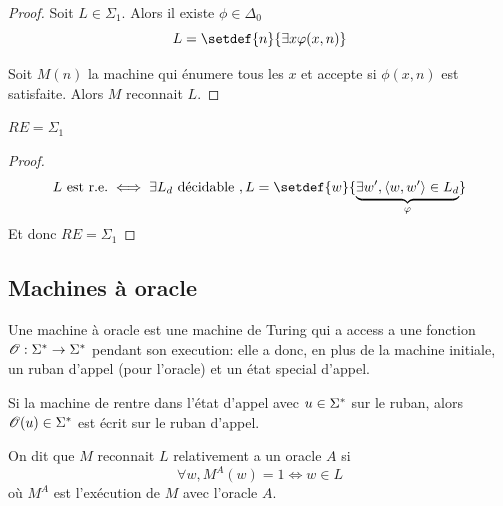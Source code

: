 \begin{proof}

	Soit $L \in \Sigma_1$. Alors il existe $\phi \in \Delta_0$ \tq
	$$ L = \setdef {n} {\exists x \phi(x,n)} $$

	Soit $M(n)$ la machine qui énumere tous les $x$ et accepte si $\phi(x,n)$ est satisfaite.
	Alors $M$ reconnait $L$.
\end{proof}


\iffalse
	\begin{prop}
		$L$ est r.e. $\implies L \in \Sigma_1$.
	\end{prop}

	\begin{proof}
		\begin{eqnarray*}
			L \text{ est r.e.} &\iff& (\forall w, w \in L \iff \exists x, eval (\encode M,w,x) = 1)\\
			&\implies& L \in \Sigma_1
		\end{eqnarray*}
	\end{proof}
\fi


\begin{prop} \label{prop:sigma-re}
	$RE = \Sigma_1$
\end{prop}

\begin{proof}
	$$L \text{ est r.e.} \iff \exists L_d \text{ décidable }, L = \setdef {w} {\underbrace{\exists w', \encode {w, w'} \in L_d}_{\phi}}$$
	Et donc $RE = \Sigma_1$
\end{proof}

\subsection{Machines à oracle}

\begin{definition}
	Une machine à oracle est une machine de Turing qui a access a une fonction $\mathscr O : \Sigma^{*} \to \Sigma^{*}$ pendant son execution: elle a donc, en plus de la machine
	initiale, un ruban d'appel (pour l'oracle) et un état special d'appel.

	Si la machine de rentre dans l'état d'appel avec $u \in \Sigma^{*}$ sur le ruban, alors $\mathscr O (u) \in \Sigma^{*}$ est écrit sur le ruban d'appel.
\end{definition}

\begin{definition}[Reconnaissance]

	On dit que $M$ reconnait $L$ relativement a un oracle $A$ si
	$$ \forall w, M^A (w) = 1 \iff w \in L $$
	où $M^A$ est l'exécution de $M$ avec l'oracle $A$.

\end{definition}


